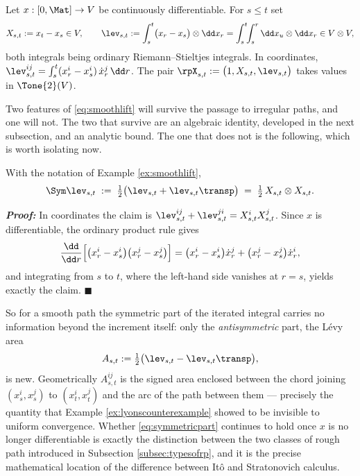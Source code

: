 \begin{example}\label{ex:smoothlift}
Let $x : [0,\Mat]\to V$ be continuously differentiable. For $s \leq t$ set
\begin{equation}\label{eq:smoothlift}
X_{s,t} := x_t - x_s \in V, \qquad
\lev_{s,t} := \int_s^t \bigl(x_r - x_s\bigr)\otimes \dd x_r = \int_s^t\!\!\int_s^r \dd x_u \otimes \dd x_r \in V\otimes V,
\end{equation}
both integrals being ordinary Riemann--Stieltjes integrals. In coordinates,
$\lev^{ij}_{s,t} = \int_s^t (x^i_r - x^i_s)\,\dot x^j_r\,\dd r$. The pair
$\rpX_{s,t} := \bigl(1, X_{s,t}, \lev_{s,t}\bigr)$ takes values in $\Tone{2}(V)$.
\end{example}

Two features of \eqref{eq:smoothlift} will survive the passage to irregular paths, and one will not.
The two that survive are an algebraic identity, developed in the next subsection, and an analytic
bound. The one that does not is the following, which is worth isolating now.

\begin{proposition}\label{prop:symmetricpart}
With the notation of Example \ref{ex:smoothlift},
\begin{equation}\label{eq:symmetricpart}
\Sym \lev_{s,t} \;:=\; \tfrac12\bigl(\lev_{s,t} + \lev_{s,t}\transp\bigr) \;=\; \tfrac12\,X_{s,t}\otimes X_{s,t}.
\end{equation}
\end{proposition}

\textbf{\textit{Proof:}} In coordinates the claim is
$\lev^{ij}_{s,t} + \lev^{ji}_{s,t} = X^i_{s,t}X^j_{s,t}$. Since $x$ is differentiable, the ordinary
product rule gives
\[
\frac{\dd}{\dd r}\Bigl[ \bigl(x^i_r - x^i_s\bigr)\bigl(x^j_r-x^j_s\bigr) \Bigr]
= \bigl(x^i_r-x^i_s\bigr)\dot x^j_r + \bigl(x^j_r-x^j_s\bigr)\dot x^i_r ,
\]
and integrating from $s$ to $t$, where the left-hand side vanishes at $r=s$, yields exactly the
claim. \hfill $\blacksquare$

\medskip

So for a smooth path the symmetric part of the iterated integral carries no information beyond the
increment itself: only the \emph{antisymmetric} part, the Lévy area
\begin{equation}\label{eq:levyarea}
A_{s,t} := \tfrac12\bigl(\lev_{s,t} - \lev_{s,t}\transp\bigr),
\end{equation}
is new. Geometrically $A^{ij}_{s,t}$ is the signed area enclosed between the chord joining
$(x^i_s,x^j_s)$ to $(x^i_t,x^j_t)$ and the arc of the path between them --- precisely the quantity
that Example \ref{ex:lyonscounterexample} showed to be invisible to uniform convergence. Whether
\eqref{eq:symmetricpart} continues to hold once $x$ is no longer differentiable is exactly the
distinction between the two classes of rough path introduced in Subsection \ref{subsec:typesofrp},
and it is the precise mathematical location of the difference between Itô and Stratonovich calculus.

